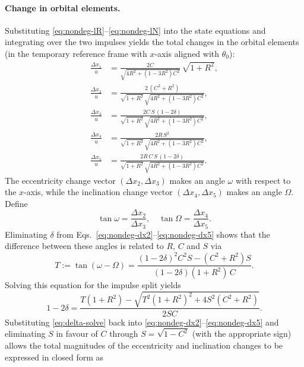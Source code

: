 \documentclass[12pt]{article}
\begin{document}
\paragraph{Change in orbital elements.}  Substituting
\eqref{eq:nondeg-lR}--\eqref{eq:nondeg-lN} into the state
equations and integrating over the two impulses yields the total
changes in the orbital elements (in the temporary reference frame with
$x$-axis aligned with $\theta_0$):
\begin{align}
  \frac{\Delta x_1}{u} &=
    \frac{2C}{\sqrt{4R^2 + (1-3R^2)C^2}}\,\sqrt{1+R^2},
    \tag{B4}\label{eq:nondeg-dx1}\\
  \frac{\Delta x_2}{u} &=
    \frac{2\,(C^2 + R^2)}{\sqrt{1+R^2}\,\sqrt{4R^2 + (1-3R^2)C^2}},
    \tag{B5}\label{eq:nondeg-dx2}\\
  \frac{\Delta x_3}{u} &=
    \frac{2C\,S\,(1-2\delta)}{\sqrt{1+R^2}\,\sqrt{4R^2 + (1-3R^2)C^2}},
    \tag{B6}\label{eq:nondeg-dx3}\\
  \frac{\Delta x_4}{u} &=
    \frac{2R\,S^2}{\sqrt{1+R^2}\,\sqrt{4R^2 + (1-3R^2)C^2}},
    \tag{B7}\label{eq:nondeg-dx4}\\
  \frac{\Delta x_5}{u} &=
    \frac{2R\,C\,S\,(1-2\delta)}{\sqrt{1+R^2}\,\sqrt{4R^2 + (1-3R^2)C^2}}.
    \tag{B8}\label{eq:nondeg-dx5}
\end{align}
The eccentricity change vector $(\Delta x_2,\Delta x_3)$ makes an
angle $\omega$ with respect to the $x$-axis, while the inclination
change vector $(\Delta x_4,\Delta x_5)$ makes an angle $\Omega$.
Define
\[
  \tan \omega = \frac{\Delta x_2}{\Delta x_3},\quad
  \tan \Omega = \frac{\Delta x_4}{\Delta x_5}.
\]
Eliminating $\delta$ from Eqs.~\eqref{eq:nondeg-dx2}--\eqref{eq:nondeg-dx5}
shows that the difference between these angles is related to $R$, $C$ and
$S$ via
\begin{equation}
  T := \tan(\omega - \Omega) =
  \frac{(1-2\delta)^2 C^2 S - (C^2 + R^2)S}{(1-2\delta)(1+R^2)\,C}.
  \tag{B9}\label{eq:T-def}
\end{equation}
Solving this equation for the impulse split yields
\begin{equation}
  1 - 2\delta =
    \frac{T(1+R^2) - \sqrt{T^2 (1+R^2)^2 + 4 S^2 (C^2 + R^2)}}{2 S C}.
  \tag{B10}\label{eq:delta-solve}
\end{equation}
Substituting \eqref{eq:delta-solve} back into
\eqref{eq:nondeg-dx2}--\eqref{eq:nondeg-dx5} and eliminating $S$ in
favour of $C$ through $S = \sqrt{1-C^2}$ (with the appropriate sign)
allows the total magnitudes of the eccentricity and inclination
changes to be expressed in closed form as
\end{document}
